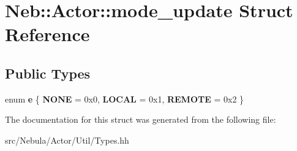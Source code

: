 \hypertarget{structNeb_1_1Actor_1_1mode__update}{\section{Neb\-:\-:Actor\-:\-:mode\-\_\-update Struct Reference}
\label{structNeb_1_1Actor_1_1mode__update}
}
\subsection*{Public Types}
\begin{DoxyCompactItemize}
\item 
enum {\bfseries e} \{ {\bfseries N\-O\-N\-E} = 0x0, 
{\bfseries L\-O\-C\-A\-L} = 0x1, 
{\bfseries R\-E\-M\-O\-T\-E} = 0x2
 \}
\end{DoxyCompactItemize}


The documentation for this struct was generated from the following file\-:\begin{DoxyCompactItemize}
\item 
src/\-Nebula/\-Actor/\-Util/Types.\-hh\end{DoxyCompactItemize}
